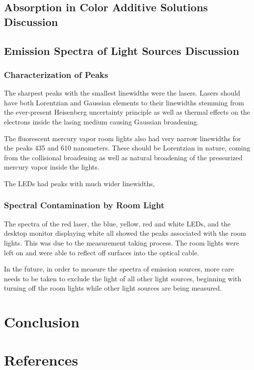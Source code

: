 \documentclass{article}
\begin{document}
\subsection{Absorption in Color Additive Solutions Discussion}

\subsection{Emission Spectra of Light Sources Discussion}

\subsubsection{Characterization of Peaks}
The sharpest peaks with the smallest linewidths were the lasers. Lasers should have both Lorentzian and Gaussian elements to their linewidths stemming from the ever-present Heisenberg uncertainty principle as well as thermal effects on the electrons inside the lasing medium causing Gaussian broadening.

The fluorescent mercury vapor room lights also had very narrow linewidths for the peaks 435 and 610 nanometers. These should be Lorentzian in nature, coming from the collisional broadening as well as natural broadening of the pressurized mercury vapor inside the lights.

The LEDs had peaks with much wider linewidths, 



\subsubsection{Spectral Contamination by Room Light}
The spectra of the red laser, the blue, yellow, red and white LEDs, and the desktop monitor displaying white all showed the peaks associated with the room lights. This was due to the measurement taking process. The room lights were left on and were able to reflect off surfaces into the optical cable. 

In the future, in order to measure the spectra of emission sources, more care needs to be taken to exclude the light of all other light sources, beginning with turning off the room lights while other light sources are being measured.
\section{Conclusion}
\section{References}
\end{document}
